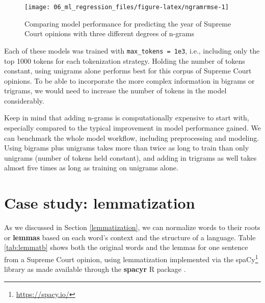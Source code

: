 \documentclass[
]{krantz}
\DeclareRobustCommand{\href}[2]{#2\footnote{\url{#1}}}
\renewcommand{\href}[2]{#2\footnote{\url{#1}}}
\begin{document}
\begin{figure}

{\centering \texttt{[image: 06\_ml\_regression\_files/figure-latex/ngramrmse-1]} 

}

\caption{Comparing model performance for predicting the year of Supreme Court opinions with three different degrees of n-grams}\label{fig:ngramrmse}
\end{figure}

Each of these models was trained with \texttt{max\_tokens\ =\ 1e3}, i.e., including only the top 1000 tokens for each tokenization strategy. Holding the number of tokens constant, using unigrams alone performs best for this corpus of Supreme Court opinions. To be able to incorporate the more complex information in bigrams or trigrams, we would need to increase the number of tokens in the model considerably.

Keep in mind that adding n-grams is computationally expensive to start with, especially compared to the typical improvement in model performance gained. We can benchmark the whole model workflow, including preprocessing and modeling. Using bigrams plus unigrams takes more than twice as long to train than only unigrams (number of tokens held constant), and adding in trigrams as well takes almost five times as long as training on unigrams alone.

\hypertarget{mlregressionlemmatization}{%
\section{Case study: lemmatization}\label{mlregressionlemmatization}}

As we discussed in Section \ref{lemmatization}, we can normalize words to their roots or \textbf{lemmas} based on each word's context and the structure of a language. Table \ref{tab:lemmatb} shows both the original words and the lemmas for one sentence from a Supreme Court opinion, using lemmatization implemented via the \href{https://spacy.io/}{spaCy} library as made available through the \textbf{spacyr} R package \citep{Benoit19}.
\end{document}
